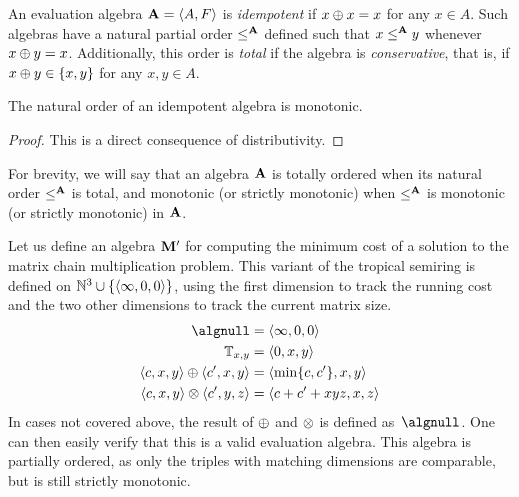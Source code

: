 \begin{definition}[Idempotency]
    An evaluation algebra \(\mathbf{A} = \left\langle A, F\right\rangle\) is \emph{idempotent} if \(x \mathbin{\oplus} x = x\) for any \(x \in A\).
    Such algebras have a natural partial order \(\le^{\mathbf{A}}\) defined such that \(x \le^{\mathbf{A}} y\) whenever \(x \mathbin{\oplus} y = x\).
    Additionally, this order is \emph{total} if the algebra is \emph{conservative}, that is, if \(x \mathbin{\oplus} y \in \{x, y\}\) for any \(x, y \in A\).
\end{definition}

\begin{lemma}
    The natural order of an idempotent algebra is monotonic.
\end{lemma}
\begin{proof}
    This is a direct consequence of distributivity.
\end{proof}

For brevity, we will say that an algebra \(\mathbf{A}\) is totally ordered when its natural order \(\le^{\mathbf{A}}\) is total, and monotonic (or strictly monotonic) when \(\le^{\mathbf{A}}\) is monotonic (or strictly monotonic) in \(\mathbf{A}\).


\begin{example}\label{ex:matrix-chain-algb}
    Let us define an algebra \(\mathbf{M}'\) for computing the minimum cost of a solution to the matrix chain multiplication problem.
    This variant of the tropical semiring is defined on \(\mathbb{N}^3 \cup \{\left\langle\infty, 0, 0\right\rangle\}\), using the first dimension to track the running cost and the two other dimensions to track the current matrix size.
    \begin{align*}
        \algnull &= \tup{\infty, 0, 0}\\
        \algterm_{x, y} &= \tup{0, x, y}\\
        \tup{c, x, y} \algplus \tup{c', x, y} &= \tup{\min\{c, c'\}, x, y}\\
        \tup{c, x, y} \algtimes \tup{c', y, z} &= \tup{c + c' + xyz, x, z}
    \end{align*}
    In cases not covered above, the result of \(\mathbin{\oplus}\) and \(\mathbin{\otimes}\) is defined as~\(\algnull\).
    One can then easily verify that this is a valid evaluation algebra.
    This algebra is partially ordered, as only the triples with matching dimensions are comparable, but is still strictly monotonic.
\end{example}


